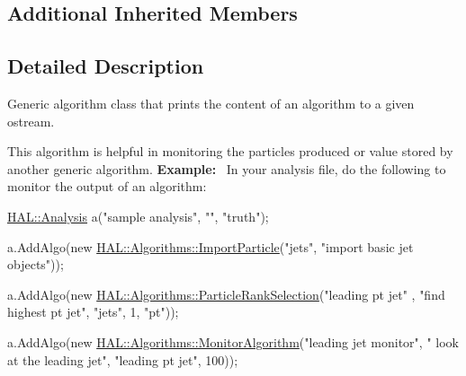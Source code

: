 \subsection*{Additional Inherited Members}


\subsection{Detailed Description}
Generic algorithm class that prints the content of an algorithm to a given ostream. 

This algorithm is helpful in monitoring the particles produced or value stored by another generic algorithm. {\bfseries Example\+:}~\newline
In your analysis file, do the following to monitor the output of an algorithm\+:


\begin{DoxyCode}
\hyperlink{class_h_a_l_1_1_analysis}{HAL::Analysis} a(\textcolor{stringliteral}{"sample analysis"}, \textcolor{stringliteral}{""}, \textcolor{stringliteral}{"truth"});

a.AddAlgo(\textcolor{keyword}{new} \hyperlink{class_h_a_l_1_1_algorithms_1_1_import_particle}{HAL::Algorithms::ImportParticle}(\textcolor{stringliteral}{"jets"}, \textcolor{stringliteral}{"import basic jet
       objects"}));

a.AddAlgo(\textcolor{keyword}{new} \hyperlink{class_h_a_l_1_1_algorithms_1_1_particle_rank_selection}{HAL::Algorithms::ParticleRankSelection}(\textcolor{stringliteral}{"leading pt jet"}
      , \textcolor{stringliteral}{"find highest pt jet"}, 
                                                     \textcolor{stringliteral}{"jets"},
                                                     1, \textcolor{stringliteral}{"pt"}));

a.AddAlgo(\textcolor{keyword}{new} \hyperlink{class_h_a_l_1_1_algorithms_1_1_monitor_algorithm}{HAL::Algorithms::MonitorAlgorithm}(\textcolor{stringliteral}{"leading jet monitor"}, \textcolor{stringliteral}{"
      look at the leading jet"}, 
                                                \textcolor{stringliteral}{"leading pt jet"}, 100));
\end{DoxyCode}
 

